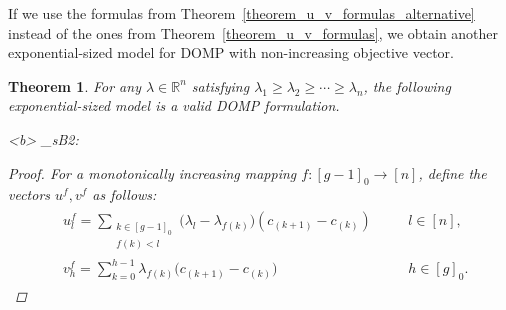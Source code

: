 \documentclass[letterpaper]{article}
\newtheorem{theorem}{Theorem}[section]
\begin{document}
If we use the formulas from Theorem~\ref{theorem_u_v_formulas_alternative} instead of the ones from Theorem~\ref{theorem_u_v_formulas}, we obtain another exponential-sized model for DOMP with non-increasing objective vector.

\begin{theorem}\label{transport_domp_formulation_alternative}
    For any $\lambda \in \mathbb{R}^n$ satisfying $\lambda_1 \geq \lambda_2 \geq \cdots \geq \lambda_n$, the following exponential-sized model is a valid DOMP formulation.
    \begin{mini!}[2]<b>
        {}
        {\theta}
        {\label{mDOMP_sB2}}{_{sB2}:\,}
    \end{mini!}
    
    \begin{proof}
        For a monotonically increasing mapping $f: [g-1]_0 \rightarrow [n]$, define the vectors $u^f, v^f$ as follows:
        \begin{align}\label{u_f_v_f_formulas_alternative}
            \begin{alignedat}{2}
                &u^f_l = \sum_{\substack{k \in [g-1]_0 \\ f(k) < l}} \bigl( \lambda_l - \lambda_{f(k)} \bigr) (c_{(k+1)} - c_{(k)})& \quad &l \in [n],\\
                &v^f_{h} = \sum_{k = 0}^{h-1} \lambda_{f(k)} \bigl( c_{(k+1)} - c_{(k)} \bigr) & \quad &h \in [g]_0.
            \end{alignedat}
        \end{align}
        

\end{proof}
\end{theorem}
\end{document}
